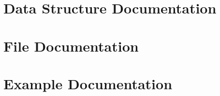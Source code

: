 \let\mypdfximage\pdfximage\def\pdfximage{\immediate\mypdfximage}\documentclass[twoside]{book}
\newcommand{\+}{\discretionary{\mbox{\scriptsize$\hookleftarrow$}}{}{}}
\newcommand{\clearemptydoublepage}{%
  \newpage{\pagestyle{empty}\cleardoublepage}%
}
\begin{document}
\chapter{Data Structure Documentation}























\chapter{File Documentation}




















\chapter{Example Documentation}


\backmatter
\newpage
{}
\clearemptydoublepage
{}
\printindex
\end{document}

